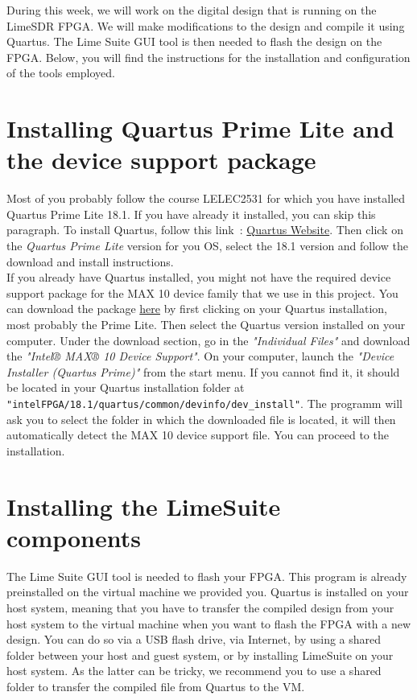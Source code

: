 
During this week, we will work on the digital design that is running on the LimeSDR FPGA. We will make modifications to the design and compile it using Quartus. The Lime Suite GUI tool is then needed to flash the design on the FPGA. Below, you will find the instructions for the installation and configuration of the tools employed.\\

\section{Installing Quartus Prime Lite and the device support package}

Most of you probably follow the course LELEC2531 for which you have installed Quartus Prime Lite 18.1. If you have already  it installed, you can skip this paragraph. To install Quartus, follow this link~: \href{https://www.intel.com/content/www/us/en/products/details/fpga/development-tools/quartus-prime/resource.html}{Quartus Website}. Then click on the \textit{Quartus Prime Lite} version for you OS, select the 18.1 version and follow the download and install instructions.\\

If you already have Quartus installed, you might not have the required device support package for the MAX 10 device family that we use in this project. You can download the package \href{https://www.intel.com/content/www/us/en/products/details/fpga/development-tools/quartus-prime/resource.html}{here} by first clicking on your Quartus installation, most probably the Prime Lite. Then select the Quartus version installed on your computer.
Under the download section, go in the \textit{"Individual Files"} and download the \textit{"Intel® MAX® 10 Device Support"}. On your computer, launch the \textit{"Device Installer (Quartus Prime)"} from the start menu. If you cannot find it, it should be located in your Quartus installation folder at \texttt{"intelFPGA/18.1/quartus/common/devinfo/dev\_install"}.
The programm will ask you to select the folder in which the downloaded file is located, it will then automatically detect the MAX 10 device support file. You can proceed to the installation.

\section{Installing the LimeSuite components}

The Lime Suite GUI tool is needed to flash your FPGA. This program is already preinstalled on the virtual machine we provided you. Quartus is installed on your host system, meaning that you have to transfer the compiled design from your host system to the virtual machine when you want to flash the FPGA with a new design. You can do so via a USB flash drive, via Internet, by using a shared folder between your host and guest system, or by installing LimeSuite on your host system. As the latter can be tricky, we recommend you to use a shared folder to transfer the compiled file from Quartus to the VM.

